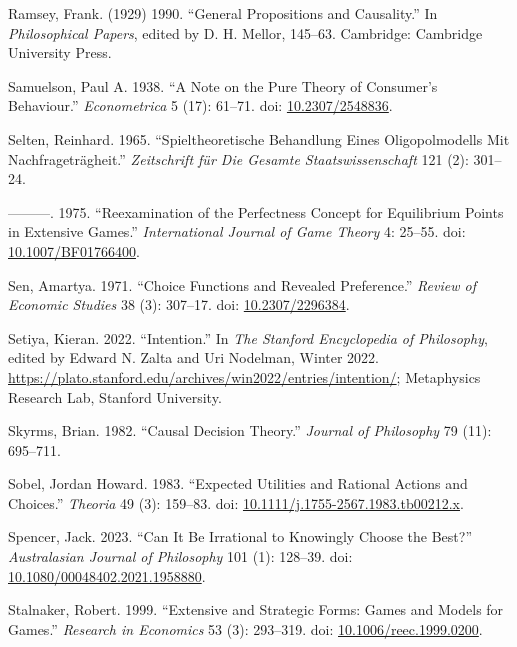 \documentclass[
  10pt,
  letterpaper,
  DIV=11,
  numbers=noendperiod,
  twoside]{scrartcl}
\newlength{\cslhangindent}
\newenvironment{CSLReferences}[2] %
 {\begin{list}{}{%
  \setlength{\itemindent}{0pt}
  \setlength{\leftmargin}{0pt}
  \setlength{\parsep}{0pt}
  \ifodd #1
   \setlength{\leftmargin}{\cslhangindent}
   \setlength{\itemindent}{-1\cslhangindent}
  \fi
  \setlength{\itemsep}{#2\baselineskip}}}
 {\end{list}}
\begin{document}
\begin{CSLReferences}{1}{0}
Ramsey, Frank. (1929) 1990. {``General Propositions and Causality.''} In
\emph{Philosophical Papers}, edited by D. H. Mellor, 145--63. Cambridge:
Cambridge University Press.

Samuelson, Paul A. 1938. {``A Note on the Pure Theory of Consumer's
Behaviour.''} \emph{Econometrica} 5 (17): 61--71. doi:
\href{https://doi.org/10.2307/2548836}{10.2307/2548836}.

Selten, Reinhard. 1965. {``Spieltheoretische Behandlung Eines
Oligopolmodells Mit Nachfragetr{ä}gheit.''} \emph{Zeitschrift f{ü}r Die
Gesamte Staatswissenschaft} 121 (2): 301--24.

---------. 1975. {``Reexamination of the Perfectness Concept for
Equilibrium Points in Extensive Games.''} \emph{International Journal of
Game Theory} 4: 25--55. doi:
\href{https://doi.org/10.1007/BF01766400}{10.1007/BF01766400}.

Sen, Amartya. 1971. {``Choice Functions and Revealed Preference.''}
\emph{Review of Economic Studies} 38 (3): 307--17. doi:
\href{https://doi.org/10.2307/2296384}{10.2307/2296384}.

Setiya, Kieran. 2022. {``{Intention}.''} In \emph{The {Stanford}
Encyclopedia of Philosophy}, edited by Edward N. Zalta and Uri Nodelman,
{W}inter 2022.
\url{https://plato.stanford.edu/archives/win2022/entries/intention/};
Metaphysics Research Lab, Stanford University.

Skyrms, Brian. 1982. {``Causal Decision Theory.''} \emph{Journal of
Philosophy} 79 (11): 695--711.

Sobel, Jordan Howard. 1983. {``Expected Utilities and Rational Actions
and Choices.''} \emph{Theoria} 49 (3): 159--83. doi:
\href{https://doi.org/10.1111/j.1755-2567.1983.tb00212.x}{10.1111/j.1755-2567.1983.tb00212.x}.

Spencer, Jack. 2023. {``Can It Be Irrational to Knowingly Choose the
Best?''} \emph{Australasian Journal of Philosophy} 101 (1): 128--39.
doi:
\href{https://doi.org/10.1080/00048402.2021.1958880}{10.1080/00048402.2021.1958880}.

Stalnaker, Robert. 1999. {``Extensive and Strategic Forms: Games and
Models for Games.''} \emph{Research in Economics} 53 (3): 293--319. doi:
\href{https://doi.org/10.1006/reec.1999.0200}{10.1006/reec.1999.0200}.


\end{CSLReferences}
\end{document}
